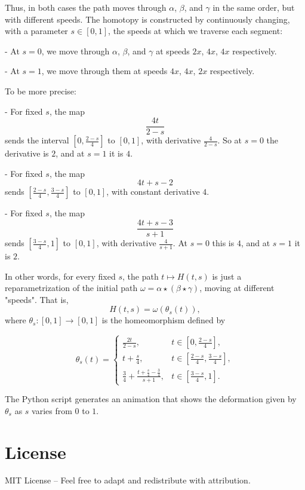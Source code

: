\documentclass[12pt]{amsart}
\begin{document}
Thus, in both cases the path moves through $\alpha$, $\beta$, and $\gamma$ in the same order, but with different speeds. The homotopy is constructed by continuously changing, with a parameter $s \in [0,1]$, the speeds at which we traverse each segment:

- At $s=0$, we move through $\alpha$, $\beta$, and $\gamma$ at speeds $2x$, $4x$, $4x$ respectively.

- At $s=1$, we move through them at speeds $4x$, $4x$, $2x$ respectively.

To be more precise:

- For fixed $s$, the map 
  $$
  \frac{4t}{2 - s}
  $$
  sends the interval $\left[0, \frac{2 - s}{4}\right]$ to $[0,1]$, with derivative $\frac{4}{2 - s}$. So at $s=0$ the derivative is $2$, and at $s=1$ it is $4$.

- For fixed $s$, the map 
  $$
  4t + s - 2
  $$
  sends $\left[\frac{2 - s}{4}, \frac{3 - s}{4}\right]$ to $[0,1]$, with constant derivative $4$.

- For fixed $s$, the map 
  $$
  \frac{4t + s - 3}{s + 1}
  $$
  sends $\left[\frac{3 - s}{4}, 1\right]$ to $[0,1]$, with derivative $\frac{4}{s + 1}$. At $s=0$ this is $4$, and at $s=1$ it is $2$.

\vspace{1em}

In other words, for every fixed $s$, the path $t \mapsto H(t,s)$ is just a reparametrization of the initial path $\omega = \alpha \star (\beta \star \gamma)$, moving at different "speeds". That is,
$$
H(t,s) = \omega(\theta_s(t)),
$$
where $\theta_s \colon [0,1] \to [0,1]$ is the homeomorphism defined by



$$
\theta_s(t) =
\begin{cases}
\displaystyle \frac{2t}{2 - s}, & t \in \left[0, \frac{2 - s}{4} \right], \\[1ex]
\displaystyle t + \frac{s}{4}, & t \in \left[ \frac{2 - s}{4}, \frac{3 - s}{4} \right], \\[1ex]
\displaystyle \frac{3}{4} + \frac{t + \frac{s}{4} - \frac{3}{4}}{s + 1}, & t \in \left[ \frac{3 - s}{4}, 1 \right].
\end{cases}
$$

The Python script generates an animation that shows the deformation given by $\theta_s$ as $s$ varies from $0$ to $1$.

\section*{License}
MIT License – Feel free to adapt and redistribute with attribution.
\end{document}

